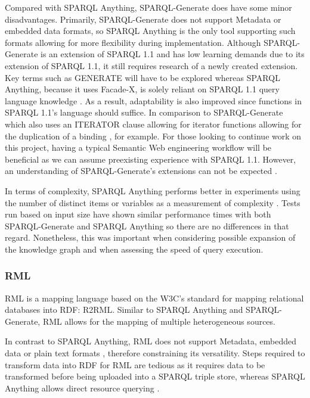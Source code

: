 Compared with SPARQL Anything, SPARQL-Generate does have some minor disadvantages. Primarily, SPARQL-Generate does not support Metadata or embedded data formats, so SPARQL Anything is the only tool supporting such formats \cite{sparqlanything} allowing for more flexibility during implementation. Although SPARQL-Generate is an extension of SPARQL 1.1 and has low learning demands due to its extension of SPARQL 1.1, it still requires research of a newly created extension. Key terms such as GENERATE will have to be explored whereas SPARQL Anything, because it uses Facade-X, is solely reliant on SPARQL 1.1 query language knowledge \cite{sparqlanything}. As a result, adaptability is also improved since functions in SPARQL 1.1's language should suffice. In comparison to SPARQL-Generate which also uses an ITERATOR clause allowing for iterator functions allowing for the duplication of a binding \cite{lefranccois2017sparql}, for example. For those looking to continue work on this project, having a typical Semantic Web engineering workflow will be beneficial as we can assume preexisting experience with SPARQL 1.1. However, an understanding of SPARQL-Generate's extensions can not be expected \cite{sparqlanything}. 

In terms of complexity, SPARQL Anything performs better in experiments using the number of distinct items or variables as a measurement of complexity \cite{sparqlanything}. Tests run based on input size have shown similar performance times with both SPARQL-Generate and SPARQL Anything so there are no differences in that regard. Nonetheless, this was important when considering possible expansion of the knowledge graph and when assessing the speed of query execution. 

\subsubsection{RML}
\hspace{0.5cm} RML is a mapping language based on the W3C's standard for mapping relational databases into RDF: R2RML. Similar to SPARQL Anything and SPARQL-Generate, RML allows for the mapping of multiple heterogeneous sources. \cite{dimou2014rml} 

In contrast to SPARQL Anything, RML does not support Metadata, embedded data or plain text formats \cite{sparqlanything}, therefore constraining its versatility. Steps required to transform data into RDF for RML are tedious as it requires data to be transformed before being uploaded into a SPARQL triple store, whereas SPARQL Anything allows direct resource querying \cite{sparqlanything}.

